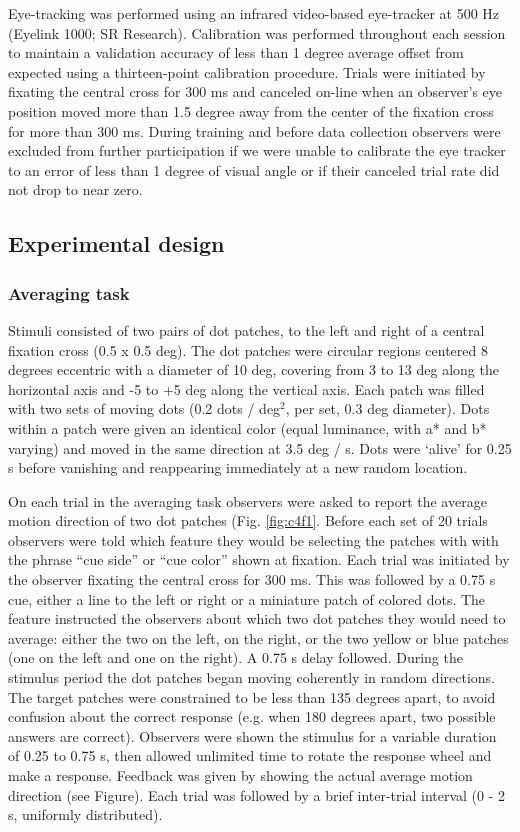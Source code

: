 Eye-tracking was performed using an infrared video-based eye-tracker at 500 Hz (Eyelink 1000; SR Research). Calibration was performed throughout each session to maintain a validation accuracy of less than 1 degree average offset from expected using a thirteen-point calibration procedure. Trials were initiated by fixating the central cross for 300 ms and canceled on-line when an observer’s eye position moved more than 1.5 degree away from the center of the fixation cross for more than 300 ms. During training and before data collection observers were excluded from further participation if we were unable to calibrate the eye tracker to an error of less than 1 degree of visual angle or if their canceled trial rate did not drop to near zero.

\subsection{Experimental design}

\subsubsection{Averaging task}

Stimuli consisted of two pairs of dot patches, to the left and right of a central fixation cross (0.5 x 0.5 deg). The dot patches were circular regions centered 8 degrees eccentric with a diameter of 10 deg, covering from 3 to 13 deg along the horizontal axis and -5 to +5 deg along the vertical axis. Each patch was filled with two sets of moving dots (0.2 dots / deg$^2$, per set, 0.3 deg diameter). Dots within a patch were given an identical color (equal luminance, with a* and b* varying) and moved in the same direction at 3.5 deg / s. Dots were `alive' for 0.25 s before vanishing and reappearing immediately at a new random location.

On each trial in the averaging task observers were asked to report the average motion direction of two dot patches (Fig. \ref{fig:c4f1}. Before each set of 20 trials observers were told which feature they would be selecting the patches with with the phrase ``cue side'' or ``cue color'' shown at fixation. Each trial was initiated by the observer fixating the central cross for 300 ms. This was followed by a 0.75 s cue, either a line to the left or right or a miniature patch of colored dots. The feature instructed the observers about which two dot patches they would need to average: either the two on the left, on the right, or the two yellow or blue patches (one on the left and one on the right). A 0.75 s delay followed. During the stimulus period the dot patches began moving coherently in random directions. The target patches were constrained to be less than 135 degrees apart, to avoid confusion about the correct response (e.g. when 180 degrees apart, two possible answers are correct). Observers were shown the stimulus for a variable duration of 0.25 to 0.75 s, then allowed unlimited time to rotate the response wheel and make a response. Feedback was given by showing the actual average motion direction (see Figure). Each trial was followed by a brief inter-trial interval (0 - 2 s, uniformly distributed).

